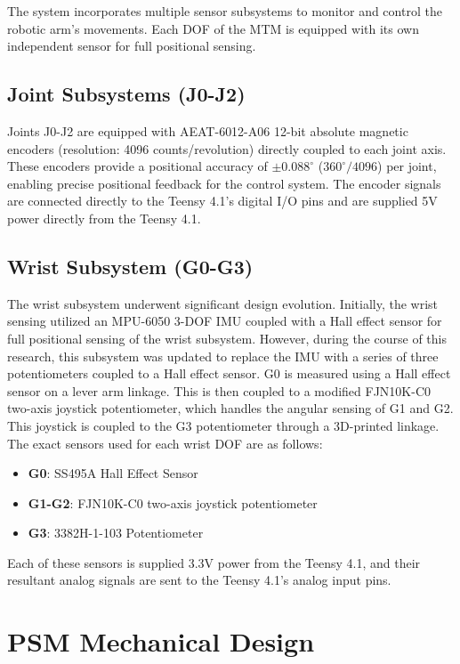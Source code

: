 The system incorporates multiple sensor subsystems to monitor and control the robotic arm's movements. Each DOF of the MTM is equipped with its own independent sensor for full positional sensing.

\subsection{Joint Subsystems (J0-J2)}
Joints J0-J2 are equipped with AEAT-6012-A06 12-bit absolute magnetic encoders (resolution: 4096 counts/revolution) directly coupled to each joint axis. These encoders provide a positional accuracy of $\pm 0.088^\circ$ ($360^\circ/4096$) per joint, enabling precise positional feedback for the control system. The encoder signals are connected directly to the Teensy 4.1's digital I/O pins and are supplied 5V power directly from the Teensy 4.1.

\subsection{Wrist Subsystem (G0-G3)}
The wrist subsystem underwent significant design evolution. Initially, the wrist sensing utilized an MPU-6050 3-DOF IMU coupled with a Hall effect sensor for full positional sensing of the wrist subsystem. However, during the course of this research, this subsystem was updated to replace the IMU with a series of three potentiometers coupled to a Hall effect sensor. G0 is measured using a Hall effect sensor on a lever arm linkage. This is then coupled to a modified FJN10K-C0 two-axis joystick potentiometer, which handles the angular sensing of G1 and G2. This joystick is coupled to the G3 potentiometer through a 3D-printed linkage. The exact sensors used for each wrist DOF are as follows:

\begin{itemize}
    \item \textbf{G0}:  SS495A Hall Effect Sensor
    \item \textbf{G1-G2}: FJN10K-C0 two-axis joystick potentiometer
    \item \textbf{G3}: 3382H-1-103 Potentiometer
\end{itemize}

Each of these sensors is supplied 3.3V power from the Teensy 4.1, and their resultant analog signals are sent to the Teensy 4.1's analog input pins.

\section{PSM Mechanical Design}

